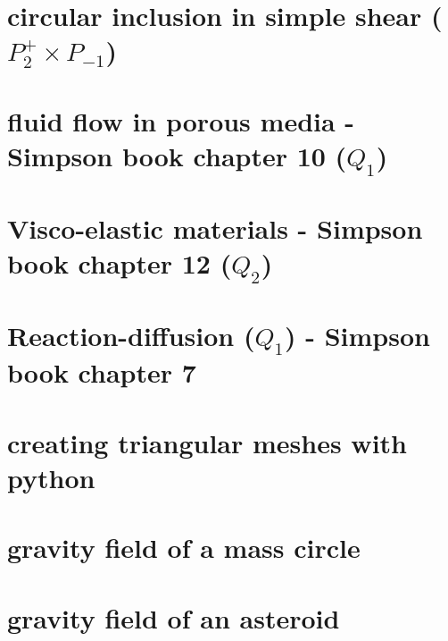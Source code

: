 \documentclass[a4paper,11pt]{report}
\begin{document}
\chapter{circular inclusion in simple shear ($P_2^+\times P_{-1}$)\label{f127}} %

\chapter{fluid flow in porous media - Simpson book chapter 10 ($Q_1$)\label{f128}} %

\chapter{Visco-elastic materials - Simpson book chapter 12 ($Q_2$)\label{f129}} %

\chapter{Reaction-diffusion ($Q_1$) - Simpson book chapter 7\label{f130}} %

\chapter{creating triangular meshes with python \label{f131}} %

\chapter{gravity field of a mass circle\label{f132}} %

\chapter{gravity field of an asteroid\label{f133}} %
\end{document}
